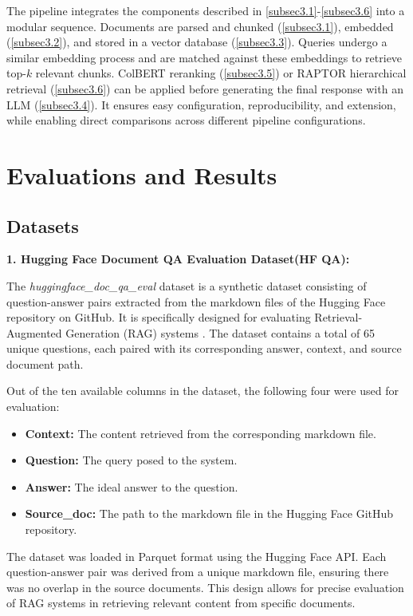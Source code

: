 \documentclass[pdflatex,sn-mathphys-num]{sn-jnl}%
\theoremstyle{thmstyleone}%
\theoremstyle{thmstyletwo}%
\theoremstyle{thmstylethree}%
\begin{document}
The pipeline integrates the components described in \ref{subsec3.1}-\ref{subsec3.6} into a modular sequence. Documents are parsed and chunked (\ref{subsec3.1}), embedded (\ref{subsec3.2}), and stored in a vector database (\ref{subsec3.3}). Queries undergo a similar embedding process and are matched against these embeddings to retrieve top-$k$ relevant chunks. ColBERT reranking (\ref{subsec3.5}) or RAPTOR hierarchical retrieval (\ref{subsec3.6}) can be applied before generating the final response with an LLM (\ref{subsec3.4}). It  ensures easy configuration, reproducibility, and extension, while enabling direct comparisons across different pipeline configurations.


\section{Evaluations and Results}\label{sec4}

\subsection{Datasets}\label{sec4.1}

\textbf{1. Hugging Face Document QA Evaluation Dataset(HF QA):}

The \textit{huggingface\_doc\_qa\_eval} dataset is a synthetic dataset consisting of question-answer pairs extracted from the markdown files of the Hugging Face repository on GitHub. It is specifically designed for evaluating Retrieval-Augmented Generation (RAG) systems \cite{huggingface2024docqa}. The dataset contains a total of 65 unique questions, each paired with its corresponding answer, context, and source document path.

Out of the ten available columns in the dataset, the following four were used for evaluation:
\begin{itemize}
    \item \textbf{Context:} The content retrieved from the corresponding markdown file.
    \item \textbf{Question:} The query posed to the system.
    \item \textbf{Answer:} The ideal answer to the question.
    \item \textbf{Source\_doc:} The path to the markdown file in the Hugging Face GitHub repository.
\end{itemize}

The dataset was loaded in Parquet format using the Hugging Face API. Each question-answer pair was derived from a unique markdown file, ensuring there was no overlap in the source documents. This design allows for precise evaluation of RAG systems in retrieving relevant content from specific documents.
\end{document}
